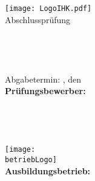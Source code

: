 \begin{titlepage}

\begin{center}
\texttt{[image: LogoIHK.pdf]}\\[1ex]
\Large{Abschlussprüfung \pruefungstermin}\\[3ex]

\Large{\ausbildungsberuf}\\
\LARGE{\betreff}\\[4ex]

\huge{\textbf{\titel}}\\[1.5ex]
\Large{\textbf{\untertitel}}\\[4ex]

\normalsize
Abgabetermin: \abgabeOrt, den \abgabeTermin\\[3em]
\textbf{Prüfungsbewerber:}\\
\autorName\\
\autorAnschrift\\
\autorOrt\\
\autorNummer\\[5ex]

\texttt{[image: \\betriebLogo]}\\[2ex]
\textbf{Ausbildungsbetrieb:}\\
\betriebName\\
\betriebAnschrift\\
\betriebOrt\\[5em]
\end{center}


\end{titlepage}

